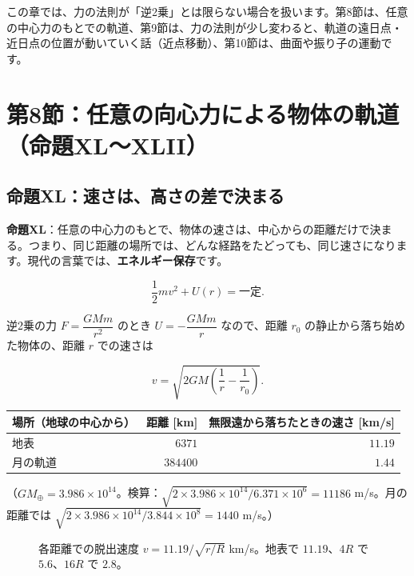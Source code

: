 \documentclass[a4paper,11pt,openany]{ltjsbook}
\begin{document}
この章では、力の法則が「逆2乗」とは限らない場合を扱います。第8節は、任意の中心力のもとでの軌道、第9節は、力の法則が少し変わると、軌道の遠日点・近日点の位置が動いていく話（近点移動）、第10節は、曲面や振り子の運動です。

\section{第8節：任意の向心力による物体の軌道（命題XL〜XLII）}

\subsection{命題XL：速さは、高さの差で決まる}

\textbf{命題XL}：任意の中心力のもとで、物体の速さは、中心からの距離だけで決まる。つまり、同じ距離の場所では、どんな経路をたどっても、同じ速さになります。現代の言葉では、\textbf{エネルギー保存}です。

\[
\frac12mv^2+U(r)=\text{一定}.
\]

逆2乗の力 $F=\dfrac{GMm}{r^2}$ のとき $U=-\dfrac{GMm}{r}$ なので、距離 $r_0$ の静止から落ち始めた物体の、距離 $r$ での速さは

\[
v=\sqrt{2GM\left(\frac1r-\frac1{r_0}\right)}.
\]

\begin{center}
\begin{tabular}{lrr}
\toprule
場所（地球の中心から） & 距離 [km] & 無限遠から落ちたときの速さ [km/s]\\
\midrule
地表 & $6371$ & $11.19$\\
月の軌道 & $384400$ & $1.44$\\
\bottomrule
\end{tabular}
\end{center}

（$GM_\oplus=3.986\times10^{14}$。検算：$\sqrt{2\times3.986\times10^{14}/6.371\times10^6}=11186$ m/s。月の距離では $\sqrt{2\times3.986\times10^{14}/3.844\times10^8}=1440$ m/s。）

\begin{figure}[htbp]
\centering
{}
\caption{各距離での脱出速度 $v=11.19/\sqrt{r/R}$ km/s。地表で $11.19$、$4R$ で $5.6$、$16R$ で $2.8$。}
\end{figure}
\end{document}
